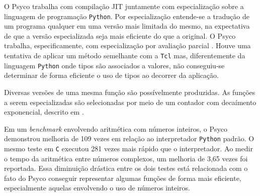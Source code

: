 O Psyco \cite{psyco} trabalha com compilação JIT juntamente com
especialização sobre a linguagem de programação \texttt{Python}.
Por especialização entende-se a tradução de um programa qualquer em
uma versão mais limitada do mesmo, na expectativa de que a versão
especializada seja mais eficiente do que a original. O Psyco trabalha,
especificamente, com especialização por avaliação parcial
\cite{partialeval}. Houve uma tentativa de aplicar um método
semelhante com a \texttt{Tcl} mas, diferentemente da linguagem
\texttt{Python} onde tipos são associados a valores, não conseguiu-se
determinar de forma eficiente o uso de tipos ao decorrer da aplicação.

Diversas versões de uma mesma função são possívelmente produzidas.
As funções a serem especializadas são selecionadas por meio de um
contador com decaímento exponencial, descrito em \cite{holzle}.

Em um \textit{benchmark} envolvendo aritmética com números inteiros, o
Psyco demonstrou melhoria de 109 vezes em relação ao interpretador
\texttt{Python} padrão. O mesmo teste em \texttt{C} executou 281 vezes
mais rápido que o interpretador. Ao medir o tempo da aritmética entre
números complexos, um melhoria de 3,65 vezes foi reportada. Essa
diminuição drástica entre os dois testes está relacionada com o fato
do Psyco conseguir representar algumas funções de forma mais
eficiente, especialmente aquelas envolvendo o uso de números inteiros.

